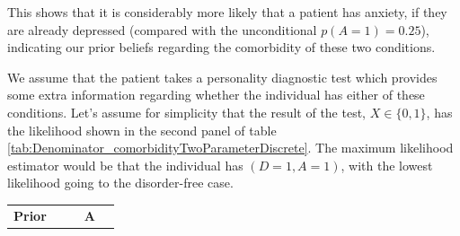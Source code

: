 \documentclass[11pt,fullpage]{book}
\begin{document}
This shows that it is considerably more likely that a patient has anxiety, if they are already depressed (compared with the unconditional $p(A=1)=0.25$), indicating our prior beliefs regarding the comorbidity of these two conditions.

We assume that the patient takes a personality diagnostic test which provides some extra information regarding whether the individual has either of these conditions. Let's assume for simplicity that the result of the test, $X\in\{0,1\}$, has the likelihood shown in the second panel of table \ref{tab:Denominator_comorbidityTwoParameterDiscrete}. The maximum likelihood estimator would be that the individual has $(D=1,A=1)$, with the lowest likelihood going to the disorder-free case.


\begin{table}[htbp]
  \centering
    \begin{tabular}{cccccc}
    \toprule
    \textbf{Prior} &       & \multicolumn{1}{c}{} & \multicolumn{2}{c}{\textbf{A}} &  \\
    

\end{tabular}
\end{table}
\end{document}

